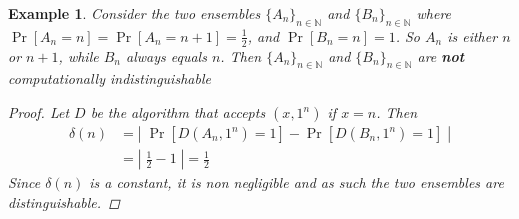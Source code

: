 \documentclass{article}
\newtheorem{example}{Example}
\begin{document}
\begin{example}
Consider the two ensembles $\{A_n\}_{n \in \mathbb{N}}$ and $\{B_n\}_{n \in \mathbb{N}}$ where $\Pr[A_n = n] = \Pr[A_n = n+1] = \frac{1}{2}$, and $\Pr[B_n = n] = 1$. So $A_n$ is either $n$ or $n+1$, while $B_n$ always equals $n$. Then $\{A_n\}_{n \in \mathbb{N}}$ and $\{B_n\}_{n \in \mathbb{N}}$ are \textbf{not} computationally indistinguishable
\begin{proof}
Let $D$ be the algorithm that accepts $(x, 1^n)$ if $x = n$. Then 
\begin{align*}
    \delta(n) &= \left| \; \Pr[D(A_n, 1^n) = 1] - \Pr[D(B_n, 1^n) = 1] \;  \right| \\
    &= \left| \; \frac{1}{2} - 1 \;  \right| = \frac{1}{2} 
\end{align*}
Since $\delta(n)$ is a constant, it is non negligible and as such the two ensembles are distinguishable. 
\end{proof}
\end{example}
\end{document}
